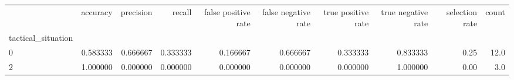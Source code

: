 \begin{tabular}{lrrrrrrrrr}
\toprule
{} &  accuracy &  precision &    recall &  false positive rate &  false negative rate &  true positive rate &  true negative rate &  selection rate &  count \\
tactical\_situation &           &            &           &                      &                      &                     &                     &                 &        \\
\midrule
0                  &  0.583333 &   0.666667 &  0.333333 &             0.166667 &             0.666667 &            0.333333 &            0.833333 &            0.25 &   12.0 \\
2                  &  1.000000 &   0.000000 &  0.000000 &             0.000000 &             0.000000 &            0.000000 &            1.000000 &            0.00 &    3.0 \\
\bottomrule
\end{tabular}
